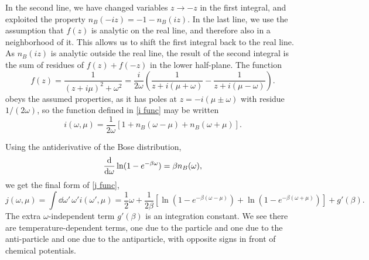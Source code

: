 In the second line, we have changed variables $z \rightarrow -z$ in the first integral, and exploited the property $n_B(-i z) = -1 - n_B(iz)$.
In the last line, we use the assumption that $f(z)$ is analytic on the real line, and therefore also in a neighborhood of it. 
This allows us to shift the first integral back to the real line.
As $n_B(iz)$ is analytic outside the real line, the result of the second integral is the sum of residues of $f(z) + f(-z)$ in the lower half-plane.
The function
%
\begin{equation}
    f(z) 
    = \frac{1}{(z + i \mu)^2 + \omega^2} 
    = \frac{i}{2 \omega } 
    \left(
        \frac{1}{z + i(\mu + \omega)} - \frac{1}{z + i(\mu - \omega)}
    \right).
\end{equation}
%
obeys the assumed properties, as it has poles at
$z = - i (\mu \pm \omega)$ with residue $1 /( 2 \omega)$, so the function defined in \autoref{i func} may be written
%
\begin{equation}
    i(\omega, \mu) 
    = \frac{1}{2\omega}
    [1 + n_B(\omega - \mu) + n_B(\omega + \mu)].
\end{equation}

Using the antiderivative of the Bose distribution,
%
\begin{equation}
    \odv{}{\omega} \ln(1 - e^{-\beta \omega}) = \beta n_B(\omega),
\end{equation}
%
we get the final form of \autoref{j func},
%
\begin{equation}
    j(\omega, \mu) = \int \dd \omega'\, \omega' i(\omega', \mu)
    =  
    \frac{1}{2}\omega + \frac{1}{2\beta} 
    \left[
        \ln\left(1 - e^{-\beta(\omega - \mu)}\right)
        + \ln\left(1 - e^{-\beta(\omega + \mu)}\right)
    \right]
    + g'(\beta).
\end{equation}
%
The extra $\omega$-independent term $g'(\beta)$ is an integration constant.
We see there are temperature-dependent terms, one due to the particle and one due to the anti-particle and one due to the antiparticle, with opposite signs in front of chemical potentials.

